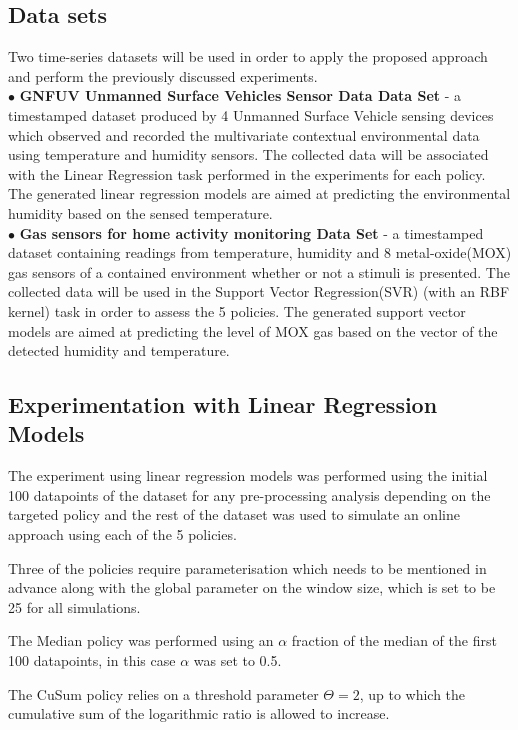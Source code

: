 \documentclass{mpaper}
\begin{document}
\subsection{Data sets}
Two time-series datasets will be used in order to apply the proposed approach and perform the previously discussed experiments.
\\$\bullet$ \textbf{GNFUV Unmanned Surface Vehicles Sensor Data Data Set} \cite{harth2018} - a timestamped dataset produced by 4 Unmanned Surface Vehicle sensing devices which observed and recorded the multivariate contextual environmental data using temperature and humidity sensors. The collected data will be associated with the Linear Regression task performed in the experiments for each policy. The generated linear regression models are aimed at predicting the environmental humidity based on the sensed temperature.
\\$\bullet$ \textbf{Gas sensors for home activity monitoring Data Set } \cite{HUERTA2016169} - a timestamped dataset containing readings from temperature, humidity and 8 metal-oxide(MOX) gas sensors of a contained environment whether or not a stimuli is presented. The collected data will be used in the Support Vector Regression(SVR) (with an RBF kernel) task in order to assess the 5 policies. The generated support vector models are aimed at predicting the level of MOX gas based on the vector of the detected humidity and temperature.

\subsection{Experimentation with Linear Regression Models}
The experiment using linear regression models was performed using the initial 100 datapoints of the dataset for any pre-processing analysis depending on the targeted policy and the rest of the dataset was used to simulate an online approach using each of the 5 policies.

Three of the policies require parameterisation which needs to be mentioned in advance along with the global parameter on the window size, which is set to be 25 for all simulations.

The Median policy was performed using an $\alpha$ fraction of the median of the first 100 datapoints, in this case $\alpha$ was set to 0.5.

The CuSum policy relies on a threshold parameter $\Theta = 2$, up to which the cumulative sum of the logarithmic ratio is allowed to increase.
\end{document}
